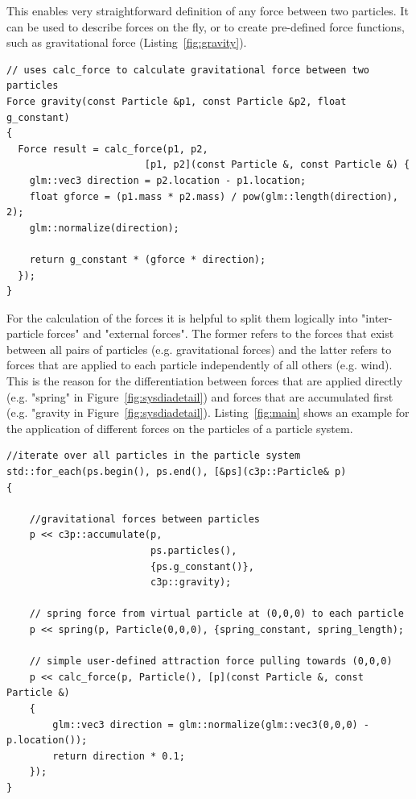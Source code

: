 \documentclass[runningheads,a4paper]{llncs}
\begin{document}
This enables very straightforward definition of any force between two particles. It can be used to describe forces on the fly, or to create pre-defined force functions, such as gravitational force (Listing~\ref{fig:gravity}).

\begin{lstlisting}[caption=gravity function]
// uses calc_force to calculate gravitational force between two particles
Force gravity(const Particle &p1, const Particle &p2, float g_constant)
{
  Force result = calc_force(p1, p2, 
						[p1, p2](const Particle &, const Particle &) {
	glm::vec3 direction = p2.location - p1.location;
	float gforce = (p1.mass * p2.mass) / pow(glm::length(direction), 2);
	glm::normalize(direction);

	return g_constant * (gforce * direction);
  });
}               
\end{lstlisting}
 \label{fig:gravity}


For the calculation of the forces it is helpful to split them logically into "inter-particle forces" and "external forces". The former refers to the forces that exist between all pairs of particles (e.g. gravitational forces) and the latter refers to forces that are applied to each particle independently of all others (e.g. wind). This is the reason for the differentiation between forces that are applied directly (e.g. "spring" in Figure~\ref{fig:sysdiadetail}) and forces that are accumulated first (e.g. "gravity in Figure~\ref{fig:sysdiadetail}). Listing~\ref{fig:main} shows an example for the application of different forces on the particles of a particle system.

\begin{lstlisting}[caption=example of how forces are calculated and applied]
//iterate over all particles in the particle system
std::for_each(ps.begin(), ps.end(), [&ps](c3p::Particle& p)
{

  	//gravitational forces between particles
	p << c3p::accumulate(p,
						 ps.particles(),
						 {ps.g_constant()},
    					 c3p::gravity);
    					 
	// spring force from virtual particle at (0,0,0) to each particle
	p << spring(p, Particle(0,0,0), {spring_constant, spring_length);

	// simple user-defined attraction force pulling towards (0,0,0)
	p << calc_force(p, Particle(), [p](const Particle &, const Particle &)
	{
    	glm::vec3 direction = glm::normalize(glm::vec3(0,0,0) - p.location());
		return direction * 0.1;
    });
}          
   
\end{lstlisting}
 \label{fig:main}
\end{document}
